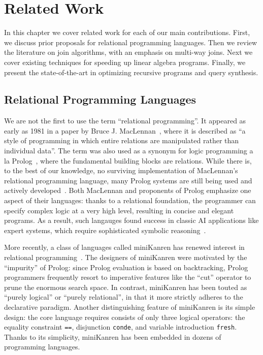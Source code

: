 \chapter{Related Work}
\label{chap:related}

In this chapter we cover related work for each of our main contributions.
First, we discuss prior proposals for relational programming languages.
Then we review the literature on join algorithms, with an emphasis on multi-way joins.
Next we cover existing techniques for speeding up linear algebra programs.
Finally, we present the state-of-the-art in optimizing recursive programs and query synthesis.

\section{Relational Programming Languages}
\label{sec:related:relational}

We are not the first to use the term ``relational programming''.
It appeared as early as 1981 in a paper by Bruce J. MacLennan~\cite{maclennan1981introduction}, 
 where it is described as ``a style of programming in which entire relations 
 are manipulated rather than individual data''.
The term was also used as a synonym for logic programming a la Prolog~\cite{colmerauer1990introduction}, 
 where the fundamental building blocks are relations.
While there is, to the best of our knowledge, no surviving implementation of MacLennan's relational programming language, 
 many Prolog systems are still being used and actively 
 developed~\cite{zhou2012language, bueno1997ciao, diaz2001design, prolog2021scryer, wielemaker2012swi}.
Both MacLennan and proponents of Prolog emphasize one aspect of their languages: 
 thanks to a relational foundation, the programmer can specify 
 complex logic at a very high level, resulting in concise and elegant programs.
As a result, such langauges found success in classic AI applications
 like expert systems, which require sophisticated symbolic reasoning~\cite{korner2022fifty}.

More recently, a class of languages called miniKanren has renewed interest 
 in relational programming~\cite{byrd2009relational, byrd2012minikanren, rozplokhas2019certified, DBLP:books/daglib/0015651}.
The designers of miniKanren were motivated by the ``impurity'' of Prolog: 
 since Prolog evaluation is based on backtracking, 
 Prolog programmers frequently resort to imperative features like the ``cut'' operator 
 to prune the enormous search space.
In contrast, miniKanren has been touted as ``purely logical'' or ``purely relational'', 
 in that it more strictly adheres to the declarative paradigm.
Another distinguishing feature of miniKanren is its simple design: 
 the core language requires consists of only three logical operators: 
 the equality constraint \verb|==|, disjunction \verb|conde|, 
 and variable introduction \verb|fresh|.
Thanks to its simplicity, miniKanren has been embedded in dozens of programming languages. 

